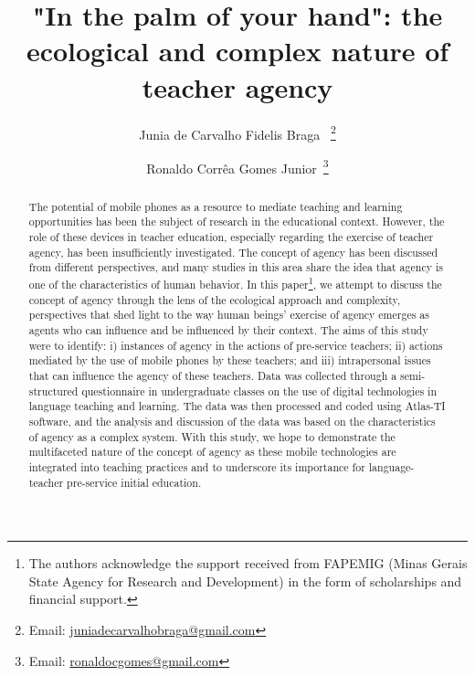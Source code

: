 \documentclass[english]{textolivre}
\title{"In the palm of your hand": the ecological and complex nature of teacher agency}
\author[1]{Junia de Carvalho Fidelis Braga ~\orcid{0000-0002-8450-2061}\thanks{Email: \href{mailto:juniadecarvalhobraga@gmail.com}{juniadecarvalhobraga@gmail.com}}}
\author[1]{Ronaldo Corrêa Gomes Junior~\orcid{0000-0003-4165-8629}\thanks{Email: \href{mailto:ronaldocgomes@gmail.com}{ronaldocgomes@gmail.com}}}
\affil[1]{Universidade Federal de Minas Gerais, Faculdade de Letras, Belo Horizonte, MG, Brasil.}
\begin{document}
\maketitle
\begin{polyabstract}
\begin{abstract}
The potential of mobile phones as a resource to mediate teaching and learning opportunities has been the subject of research in the educational context. However, the role of these devices in teacher education, especially regarding the exercise of teacher agency, has been insufficiently investigated. The concept of agency has been discussed from different perspectives, and many studies in this area share the idea that agency is one of the characteristics of human behavior. In this paper\footnote{The authors acknowledge the support received from FAPEMIG (Minas Gerais State Agency for Research and Development) in the form of scholarships and financial support.}, we attempt to discuss the concept of agency through the lens of the ecological approach and complexity, perspectives that shed light to the way human beings’ exercise of agency emerges as agents who can influence and be influenced by their context. The aims of this study were to identify: i) instances of agency in the actions of pre-service teachers; ii) actions mediated by the use of mobile phones by these teachers; and iii) intrapersonal issues that can influence the agency of these teachers. Data was collected through a semi-structured questionnaire in undergraduate classes on the use of digital technologies in language teaching and learning. The data was then processed and coded using Atlas-TI software, and the analysis and discussion of the data was based on the characteristics of agency as a complex system. With this study, we hope to demonstrate the multifaceted nature of the concept of agency as these mobile technologies are integrated into teaching practices and to underscore its importance for language-teacher pre-service initial education.



\end{abstract}


\end{polyabstract}
\end{document}

